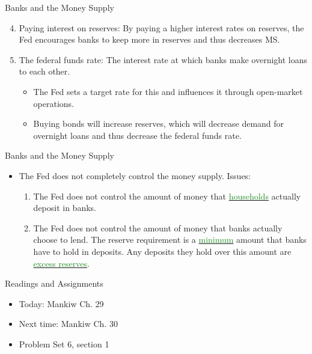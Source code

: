 \documentclass[xcolor={dvipsnames},pdf, hyperref={colorlinks=true, citecolor=ForestGreen, linkcolor=BlueViolet, urlcolor=Magenta}]{beamer}
\theoremstyle{definition}
\newcommand{\dd}[1]{{\underline{\textcolor{ForestGreen}{#1}}}}
\begin{document}
\begin{frame}{Banks and the Money Supply}
\begin{enumerate}
\setcounter{enumi}{3}
	\item Paying interest on reserves: By paying a higher interest rates on reserves, the Fed encourages banks to keep more in reserves and thus decreases MS.
	\item The federal funds rate: The interest rate at which banks make overnight loans to each other.
	\begin{itemize}
		\item  The Fed sets a target rate for this and influences it through open-market operations. 
		\item Buying bonds will increase reserves, which will decrease demand for overnight loans and thus decrease the federal funds rate.
	\end{itemize}
\end{enumerate}
\end{frame}

\begin{frame}{Banks and the Money Supply}
\begin{itemize}
	\item The Fed does not completely control the money supply. Issues:
\begin{enumerate}
	\item The Fed does not control the amount of money that \dd{households} actually deposit in banks. 
	\item The Fed does not control the amount of money that banks actually choose to lend. The reserve requirement is a \dd{minimum} amount that banks have to hold in deposits. Any deposits they hold over this amount are \dd{excess reserves}.
\end{enumerate}
\end{itemize}
\end{frame}

\begin{frame}{Readings and Assignments}
\begin{itemize}
	\item Today: Mankiw Ch. 29
	\item Next time: Mankiw Ch. 30
	\item Problem Set 6, section 1

\end{itemize}
\end{frame}
\end{document}
